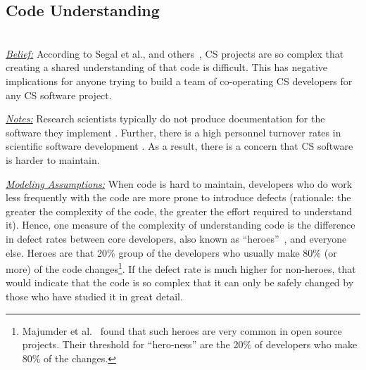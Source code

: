\documentclass[sigconf,review,anonymous]{acmart}
\begin{document}




  
 
\subsection{Code Understanding} ~\\
\noindent \textit{\underline{Belief:}} According to
Segal et al., and others~\cite{segal07_problem, carver06_hpc, Shull05_parallel, sanders08_risk},
CS projects are so complex that creating
a shared understanding of that code is difficult.
This has negative implications for anyone trying to build a team of co-operating CS developers for any CS software project.

\noindent \textit{\underline{Notes:}} Research scientists typically do not produce documentation for the software they implement \cite{segal07_enduser, sanders08_risk}.
Further, there is a high personnel turnover rates in scientific software development \cite{carver06_hpc, segal07_problem}. As a result, there is a concern that CS software is harder to maintain. 

\noindent \textit{\underline{Modeling Assumptions:}} 
When code is hard to maintain,
developers who do work less frequently with the code are more prone to introduce defects
(rationale: the greater the complexity of the code, the greater the effort required to understand it).
Hence, one measure of the complexity of understanding code
is the difference in defect rates between core developers, also known as ``heroes''~\cite{agrawal2018we, goeminne2011evidence, torres2011analysis, robles2009evolution}, and everyone else.
Heroes are that  20\% group of the developers who usually make 80\% (or more) of the code changes\footnote{ Majumder et al.~\cite{majumder19_heroes} found that such heroes are very common in open source projects. Their threshold for ``hero-ness'' are the 20\% of developers
who make 80\% of the changes.}.
If the defect rate is much higher for non-heroes, that would
indicate that the code is so complex that it can only
be safely changed by those who have studied it in great detail.
\end{document}
